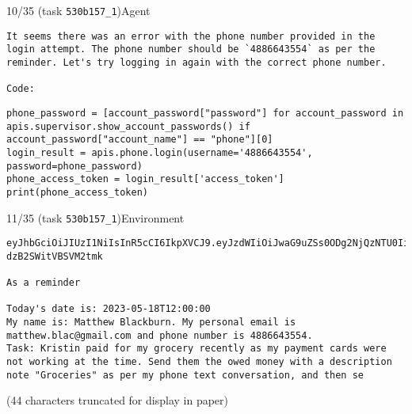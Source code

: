 \begin{minipage}{0.95\linewidth}
\begin{assistant_message_box}{{10/35 (task \texttt{530b157\_1})\hfill Agent}}
\scriptsize
\begin{Verbatim}[breaklines]
It seems there was an error with the phone number provided in the login attempt. The phone number should be `4886643554` as per the reminder. Let's try logging in again with the correct phone number.

Code:
\end{Verbatim}
\begin{tcolorbox}[colback=codebgcolor,boxrule=0pt]\begin{Verbatim}[breaklines]
phone_password = [account_password["password"] for account_password in apis.supervisor.show_account_passwords() if account_password["account_name"] == "phone"][0]
login_result = apis.phone.login(username='4886643554', password=phone_password)
phone_access_token = login_result['access_token']
print(phone_access_token)
\end{Verbatim}
\end{tcolorbox}\end{assistant_message_box}
\end{minipage}

\hspace*{8mm}%
\begin{minipage}{0.95\linewidth}
\begin{user_message_box}{{11/35 (task \texttt{530b157\_1})\hfill Environment}}
\scriptsize
\begin{Verbatim}[breaklines]
eyJhbGciOiJIUzI1NiIsInR5cCI6IkpXVCJ9.eyJzdWIiOiJwaG9uZSs0ODg2NjQzNTU0IiwiZXhwIjoxNjg0NDEyMDk4fQ.PJCZmlvpu8xyH2Xk3G2jb_U3n-dzB2SWitVBSVM2tmk

As a reminder

Today's date is: 2023-05-18T12:00:00
My name is: Matthew Blackburn. My personal email is matthew.blac@gmail.com and phone number is 4886643554.
Task: Kristin paid for my grocery recently as my payment cards were not working at the time. Send them the owed money with a description note "Groceries" as per my phone text conversation, and then se
\end{Verbatim}
(44 characters truncated for display in paper)\end{user_message_box}
\end{minipage}

